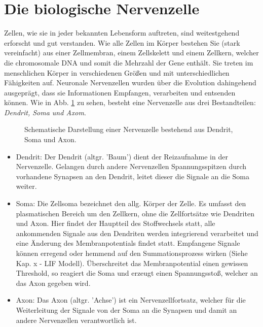 \section{Die biologische Nervenzelle}
\label{sec:neuro_nervenzelle}
	Zellen, wie sie in jeder bekannten Lebensform auftreten, sind weitestgehend erforscht und gut verstanden. Wie alle Zellen im Körper bestehen Sie (stark vereinfacht) aus einer Zellmembran, einem Zellskelett und einem Zellkern, welcher die chromosomale DNA und somit die Mehrzahl der Gene enthält. Sie treten im menschlichen Körper in verschiedenen Größen und mit unterschiedlichen Fähigkeiten auf. Neuronale Nervenzellen wurden über die Evolution dahingehend ausgeprägt, dass sie Informationen Empfangen, verarbeiten und entsenden können. Wie in Abb. \ref{fig:neuron} zu sehen, besteht eine Nervenzelle aus drei Bestandteilen: \textit{Dendrit, Soma und Axom}.
	\begin{figure}[!h] %
		\centering
		\def\svgwidth{12cm}
		
		\caption{Schematische Darstellung einer Nervenzelle bestehend aus Dendrit, Soma und Axon.}
		\label{fig:neuron}
	\end{figure}
	\begin{itemize}
		\item Dendrit:
			\subitem Der Dendrit (altgr. 'Baum') dient der Reizaufnahme in der Nervenzelle. Gelangen durch andere Nervenzellen Spannungsspitzen durch vorhandene Synapsen an den Dendrit, leitet dieser die Signale an die Soma weiter.
		\item Soma:
			\subitem Die Zellsoma bezeichnet den allg. Körper der Zelle. Es umfasst den plasmatischen Bereich um den Zellkern, ohne die Zellfortsätze wie Dendriten und Axon. Hier findet der Hauptteil des Stoffwechsels statt, alle ankommenden Signale aus den Dendriten werden integrierend verarbeitet und eine Änderung des Membranpotentials findet statt. Empfangene Signale können erregend oder hemmend auf den Summationsprozess wirken (Siehe Kap. x - LIF Modell). Überschreitet das Membranpotential einen gewissen Threshold, so reagiert die Soma und erzeugt einen Spannungsstoß, welcher an das Axon gegeben wird.
		\item Axon:
			\subitem Das Axon (altgr. 'Achse') ist ein Nervenzellfortsatz, welcher für die Weiterleitung der Signale von der Soma an die Synapsen und damit an andere Nervenzellen verantwortlich ist.
	\end{itemize}
